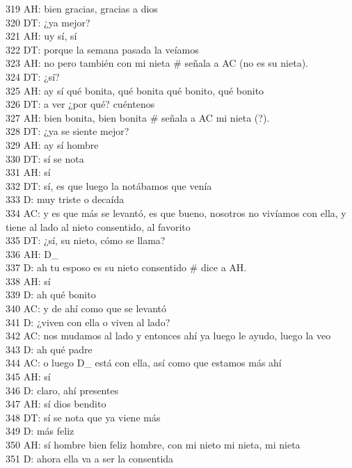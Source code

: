 319 AH: bien gracias, gracias a dios\\
320 DT: ¿ya mejor?\\
321 AH: uy sí, sí\\
322 DT: porque la semana pasada la veíamos\\
323 AH: no pero también con mi nieta \# señala a AC (no es su nieta).\\
324 DT: ¿sí?\\
325 AH: ay sí qué bonita, qué bonita qué bonito, qué bonito\\
326 DT: a ver ¿por qué? cuéntenos\\
327 AH: bien bonita, bien bonita \# señala a AC mi nieta (?).\\
328 DT: ¿ya se siente mejor?\\
329 AH: ay sí hombre\\
330 DT: sí se nota\\
331 AH: sí\\
332 DT: sí, es que luego la notábamos que venía\\
333 D: muy triste o decaída\\
334 AC: y es que más se levantó, es que bueno, nosotros no vivíamos con ella, y tiene al lado al nieto consentido, al favorito\\
335 DT: ¿sí, su nieto, cómo se llama?\\
336 AH: D\_\\
337 D: ah tu esposo es su nieto consentido \# dice a AH.\\
338 AH: sí\\
339 D: ah qué bonito\\
340 AC: y de ahí como que se levantó\\
341 D: ¿viven con ella o viven al lado?\\
342 AC: nos mudamos al lado y entonces ahí ya luego le ayudo, luego la veo\\
343 D: ah qué padre\\
344 AC: o luego D\_ está con ella, así como que estamos más ahí\\
345 AH: sí\\
346 D: claro, ahí presentes\\
347 AH: sí dios bendito\\
348 DT: sí se nota que ya viene más\\
349 D: más feliz\\
350 AH: sí hombre bien feliz hombre, con mi nieto mi nieta, mi nieta\\
351 D: ahora ella va a ser la consentida\\
